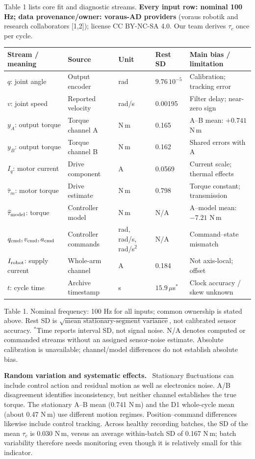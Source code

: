 \documentclass[10pt,letterpaper]{article}
\newcommand{\heading}[1]{\vspace{5pt}{\large\bfseries #1}\par\vspace{1pt}}
\newcommand{\subhead}[1]{\textbf{#1}\ }
\begin{document}
\heading{2.3 Variable and Uncertainty Budget}
Table 1 lists core fit and diagnostic streams. \textbf{Every input row: nominal 100 Hz; data provenance/owner: voraus-AD providers} (voraus robotik and research collaborators [1,2]); license CC BY-NC-SA 4.0. Our team derives $\tau_c$ once per cycle.

{\small
\begin{tabularx}{\linewidth}{@{}L{2.45cm}L{2.7cm}L{1.55cm}L{1.65cm}Y@{}}
\toprule
\textbf{Stream / meaning} & \textbf{Source} & \textbf{Unit} & \textbf{Rest SD} & \textbf{Main bias / limitation}\\
\midrule
$q$: joint angle & Output encoder & rad & $9.76\,10^{-5}$ & Calibration; tracking error\\
$v$: joint speed & Reported velocity & rad/s & 0.00195 & Filter delay; near-zero sign\\
$y_A$: output torque & Torque channel A & N\,m & 0.165 & A--B mean: $+0.741$ N\,m\\
$y_B$: output torque & Torque channel B & N\,m & 0.162 & Shared errors with A\\
$I_q$: motor current & Drive component & A & 0.0569 & Current scale; thermal effects\\
$\widehat{\tau}_m$: motor torque & Drive estimate & N\,m & 0.798 & Torque constant; transmission\\
$\widehat{\tau}_{\rm model}$: torque & Controller model & N\,m & N/A & A--model mean: $-7.21$ N\,m\\
$q_{\rm cmd},v_{\rm cmd},a_{\rm cmd}$ & Controller commands & rad, rad/s, rad/s$^2$ & N/A & Command--state mismatch\\
$I_{\rm robot}$: supply current & Whole-arm channel & A & 0.184 & Not axis-local; offset\\
$t$: cycle time & Archive timestamp & s & $15.9\,\mu$s$^*$ & Clock accuracy / skew unknown\\
\bottomrule
\end{tabularx}
}
{\footnotesize Table 1. Nominal frequency: 100 Hz for all inputs; common ownership is stated above. Rest SD is $\sqrt{\text{mean stationary-segment variance}}$, not calibrated sensor accuracy. $^*$Time reports interval SD, not signal noise. N/A denotes computed or commanded streams without an assigned sensor-noise estimate. Absolute calibration is unavailable; channel/model differences do not establish absolute bias.}

\heading{2.3 Error Interpretation and Propagation}
\subhead{Random variation and systematic effects.}
Stationary fluctuations can include control action and residual motion as well as electronics noise. A/B disagreement identifies inconsistency, but neither channel establishes the true torque. The stationary A--B mean (0.741 N\,m) and the D1 whole-cycle mean (about 0.47 N\,m) use different motion regimes. Position--command differences likewise include control tracking. Across healthy recording batches, the SD of the mean $\tau_c$ is 0.030 N\,m, versus an average within-batch SD of 0.167 N\,m; batch variability therefore needs monitoring even though it is relatively small for this indicator.
\end{document}
